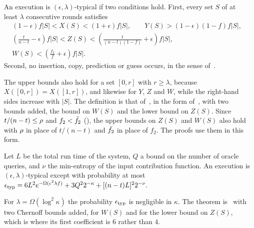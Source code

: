 \begin{definition}\label{def.typical}
    An execution is $(\epsilon,\lambda)$-typical if two conditions hold.
    First, every set $S$ of at least $\lambda$ consecutive rounds satisfies
    \[
        \begin{gathered}
            (1-\epsilon)f|S| < X(S) < (1+\epsilon)f|S|,
            \qquad Y(S) > (1-\epsilon)(1-f)f|S|,\\
            \left(\frac{t}{n-t}-\epsilon\right)f|S| < Z(S)
            < \left(\frac{t}{(n-t)(1-f)}+\epsilon\right)f|S|,\\
            W(S) < \left(\frac{f_2}{f}+\epsilon\right)f|S| .
        \end{gathered}
    \]
    Second, no insertion, copy, prediction or guess occurs, in the sense
    of~\cite[Definition 4.3]{gkl24}.
\end{definition}

The upper bounds also hold for a set $[0,r]$ with $r\ge\lambda$, because
$X([0,r])=X([1,r])$, and likewise for $Y$, $Z$ and $W$, while the right-hand
sides increase with $|S|$. The definition is that of~\cite[Definition
4.4]{gkl24}, in the form of~\cite[Lemma 4.6]{gkl24}, with two bounds added, the
bound on $W(S)$ and the lower bound on $Z(S)$. Since $t/(n-t)\le\rho$ and
$f_2<\bar{f}_2$ (), the upper bounds on $Z(S)$ and $W(S)$ also hold with $\rho$ in place of $t/(n-t)$ and
$\bar{f}_2$ in place of $f_2$. The proofs use them in this form.

\begin{theorem}[Typicality]\label{thm.typical}
    Let $L$ be the total run time of the system, $Q$ a bound on the number of
    oracle queries, and $\nu$ the min-entropy of the input contribution
    function. An execution is $(\epsilon,\lambda)$-typical except with
    probability at most
    \(
        \epsilon_{\mathrm{typ}}=6L^2e^{-\Omega(\epsilon^2\lambda f)}+3Q^22^{-\kappa}+[(n-t)L]^22^{-\nu}.
    \)
\end{theorem}

For $\lambda=\Omega(\log^2\kappa)$ the probability $\epsilon_{\mathrm{typ}}$ is negligible in
$\kappa$. The theorem is~\cite[Theorem 4.5]{gkl24} with two Chernoff bounds
added, for $W(S)$ and for the lower bound on $Z(S)$, which is where its first
coefficient is $6$ rather than $4$.

